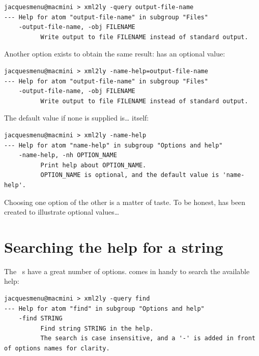 \begin{lstlisting}[language=Terminal]
jacquesmenu@macmini > xml2ly -query output-file-name
--- Help for atom "output-file-name" in subgroup "Files"
    -output-file-name, -obj FILENAME
          Write output to file FILENAME instead of standard output.
\end{lstlisting}

Another option exists to obtain the same result:  has an optional value:
\begin{lstlisting}[language=Terminal]
jacquesmenu@macmini > xml2ly -name-help=output-file-name
--- Help for atom "output-file-name" in subgroup "Files"
    -output-file-name, -obj FILENAME
          Write output to file FILENAME instead of standard output.
\end{lstlisting}

The default value if none is supplied is\dots {} itself:
\begin{lstlisting}[language=Terminal]
jacquesmenu@macmini > xml2ly -name-help
--- Help for atom "name-help" in subgroup "Options and help"
    -name-help, -nh OPTION_NAME
          Print help about OPTION_NAME.
          OPTION_NAME is optional, and the default value is 'name-help'.
\end{lstlisting}

Choosing one option of the other is a matter of taste. To be honest,  has been created to illustrate optional values\dots


\section{Searching the help for a string}

The \mf\ \service s have a great number of options.  comes in handy to search the available help:
\begin{lstlisting}[language=Terminal]
jacquesmenu@macmini > xml2ly -query find
--- Help for atom "find" in subgroup "Options and help"
    -find STRING
          Find string STRING in the help.
          The search is case insensitive, and a '-' is added in front of options names for clarity.
\end{lstlisting}

